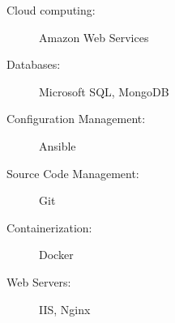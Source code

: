 
\begin{minipage}[t]{.3\linewidth}
  \raggedright
  \begin{description}
    \item[Cloud computing:] Amazon Web Services
  \end{description}
\end{minipage}%
\hfil
\begin{minipage}[t]{.3\linewidth}
  \raggedright
  \begin{description}
    \item[Databases:] Microsoft SQL, MongoDB
  \end{description}
\end{minipage}


\begin{minipage}[t]{.3\linewidth}
  \raggedright
  \begin{description}
    \item[Configuration Management:] Ansible
  \end{description}
\end{minipage}%
\hfil
\begin{minipage}[t]{.3\linewidth}
  \raggedright
  \begin{description}
    \item[Source Code Management:] Git
  \end{description}
\end{minipage}


\begin{minipage}[t]{.3\linewidth}
  \raggedright
  \begin{description}
    \item[Containerization:] Docker
  \end{description}
\end{minipage}%
\hfil
\begin{minipage}[t]{.3\linewidth}
  \raggedright
  \begin{description}
    \item[Web Servers:] IIS, Nginx
  \end{description}
\end{minipage}
